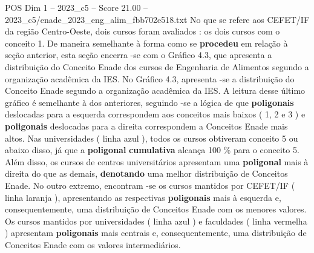 \begin{textsample}{POS Dim 1 – 2023\_c5 – Score 21.00 – 2023\_c5/enade\_2023\_eng\_alim\_fbb702e518.txt}
No que se refere aos CEFET/IF da região Centro-Oeste, dois cursos foram avaliados : os dois cursos com o conceito 1.
De maneira semelhante à forma como se \textbf{procedeu} em relação à seção anterior, esta seção encerra -se com o Gráfico 4.3, que apresenta a distribuição do Conceito Enade dos cursos de Engenharia de Alimentos segundo a organização acadêmica da IES.
No Gráfico 4.3, apresenta -se a distribuição do Conceito Enade segundo a organização acadêmica da IES.
A leitura desse último gráfico é semelhante à dos anteriores, seguindo -se a lógica de que \textbf{poligonais} deslocadas para a esquerda correspondem aos conceitos mais baixos ( 1, 2 e 3 ) e \textbf{poligonais} deslocadas para a direita correspondem a Conceitos Enade mais altos.
Nas universidades ( linha azul ), todos os cursos obtiveram conceito 5 ou abaixo disso, já que a \textbf{poligonal} \textbf{cumulativa} alcança 100 \% para o conceito 5.
Além disso, os cursos de centros universitários apresentam uma \textbf{poligonal} mais à direita do que as demais, \textbf{denotando} uma melhor distribuição de Conceitos Enade.
No outro extremo, encontram -se os cursos mantidos por CEFET/IF ( linha laranja ), apresentando as respectivas \textbf{poligonais} mais à esquerda e, consequentemente, uma distribuição de Conceitos Enade com os menores valores.
Os cursos mantidos por universidades ( linha azul ) e faculdades ( linha vermelha ) apresentam \textbf{poligonais} mais centrais e, consequentemente, uma distribuição de Conceitos Enade com os valores intermediários.

\end{textsample}
